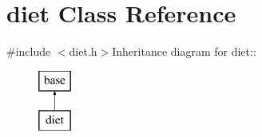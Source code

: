 \hypertarget{classdiet}{
\section{diet Class Reference}
\label{classdiet}
}


{\ttfamily \#include $<$diet.h$>$}Inheritance diagram for diet::\begin{figure}[H]
\begin{center}
\leavevmode
\includegraphics[height=2cm]{classdiet}
\end{center}
\end{figure}
